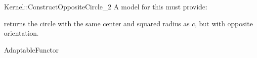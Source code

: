 \begin{ccRefFunctionObjectConcept}{Kernel::ConstructOppositeCircle_2}
A model for this must provide:


{ returns the circle with the same center and squared radius as
  $c$, but with opposite orientation.}

\ccRefines
AdaptableFunctor

\ccSeeAlso
{}\\

\end{ccRefFunctionObjectConcept}
